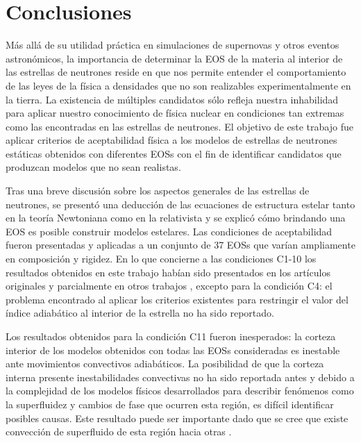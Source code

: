 \chapter*{Conclusiones}
\noindent Más allá de su utilidad práctica en simulaciones de supernovas y otros eventos astronómicos, la importancia de determinar la EOS de la materia al interior de las estrellas de neutrones reside en que nos permite entender el comportamiento de las leyes de la física a densidades que no son realizables experimentalmente en la tierra. La existencia de múltiples candidatos sólo refleja nuestra inhabilidad para aplicar nuestro conocimiento de física nuclear en condiciones tan extremas como las encontradas en las estrellas de neutrones. El objetivo de este trabajo fue aplicar criterios de aceptabilidad física a los modelos de estrellas de neutrones estáticas obtenidos con diferentes EOSs con el fin de identificar candidatos que produzcan modelos que no sean realistas. 

Tras una breve discusión sobre los aspectos generales de las estrellas de neutrones, se presentó una deducción de las ecuaciones de estructura estelar tanto en la teoría Newtoniana como en la relativista y se explicó cómo brindando una EOS es posible construir modelos estelares. Las condiciones de aceptabilidad fueron presentadas y aplicadas a un conjunto de 37 EOSs que varían ampliamente en composición y rigidez. En lo que concierne a las condiciones C1-10 los resultados obtenidos en este trabajo habían sido presentados en los artículos originales y parcialmente en otros trabajos \cite{Ozel2016,Read2009}, excepto para la condición C4: el problema encontrado al aplicar los criterios existentes para restringir el valor del índice adiabático al interior de la estrella no ha sido reportado. 

Los resultados obtenidos para la condición C11 fueron inesperados: la corteza interior de los modelos obtenidos con todas las EOSs consideradas es inestable ante movimientos convectivos adiabáticos. La posibilidad de que la corteza interna presente inestabilidades convectivas no ha sido reportada antes y debido a la complejidad de los modelos físicos desarrollados para describir fenómenos como la superfluidez y cambios de fase que ocurren esta región, es difícil identificar posibles causas. Este resultado puede ser importante dado que se cree que existe convección de superfluido de esta región hacia otras \cite{Haensel2007}. 

